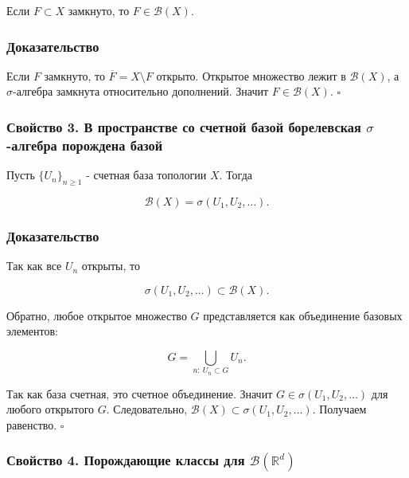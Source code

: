 \documentclass[
  11pt,
  a4paper,
]{article}
\begin{document}
Если \(F\subset X\) замкнуто, то \(F\in\mathcal B(X)\).

\subsubsection{Доказательство}\label{ux434ux43eux43aux430ux437ux430ux442ux435ux43bux44cux441ux442ux432ux43e-1}

Если \(F\) замкнуто, то \(\overline{F}=X\setminus F\) открыто. Открытое
множество лежит в \(\mathcal B(X)\), а \(\sigma\)-алгебра замкнута
относительно дополнений. Значит \(F\in\mathcal B(X)\). \(\square\)

\subsubsection{\texorpdfstring{Свойство 3. В пространстве со счетной
базой борелевская \(\sigma\)-алгебра порождена
базой}{Свойство 3. В пространстве со счетной базой борелевская \textbackslash sigma-алгебра порождена базой}}\label{ux441ux432ux43eux439ux441ux442ux432ux43e-3.-ux432-ux43fux440ux43eux441ux442ux440ux430ux43dux441ux442ux432ux435-ux441ux43e-ux441ux447ux435ux442ux43dux43eux439-ux431ux430ux437ux43eux439-ux431ux43eux440ux435ux43bux435ux432ux441ux43aux430ux44f-sigma-ux430ux43bux433ux435ux431ux440ux430-ux43fux43eux440ux43eux436ux434ux435ux43dux430-ux431ux430ux437ux43eux439}

Пусть \(\{U_n\}_{n\ge1}\) - счетная база топологии \(X\). Тогда

\[
\mathcal B(X)=\sigma(U_1,U_2,\ldots).
\]

\subsubsection{Доказательство}\label{ux434ux43eux43aux430ux437ux430ux442ux435ux43bux44cux441ux442ux432ux43e-2}

Так как все \(U_n\) открыты, то

\[
\sigma(U_1,U_2,\ldots)\subset\mathcal B(X).
\]

Обратно, любое открытое множество \(G\) представляется как объединение
базовых элементов:

\[
G=\bigcup_{n:\ U_n\subset G}U_n.
\]

Так как база счетная, это счетное объединение. Значит
\(G\in\sigma(U_1,U_2,\ldots)\) для любого открытого \(G\).
Следовательно, \(\mathcal B(X)\subset\sigma(U_1,U_2,\ldots)\). Получаем
равенство. \(\square\)

\subsubsection{\texorpdfstring{Свойство 4. Порождающие классы для
\(\mathcal B(\mathbb R^d)\)}{Свойство 4. Порождающие классы для \textbackslash mathcal B(\textbackslash mathbb R\^{}d)}}\label{ux441ux432ux43eux439ux441ux442ux432ux43e-4.-ux43fux43eux440ux43eux436ux434ux430ux44eux449ux438ux435-ux43aux43bux430ux441ux441ux44b-ux434ux43bux44f-mathcal-bmathbb-rd}
\end{document}
